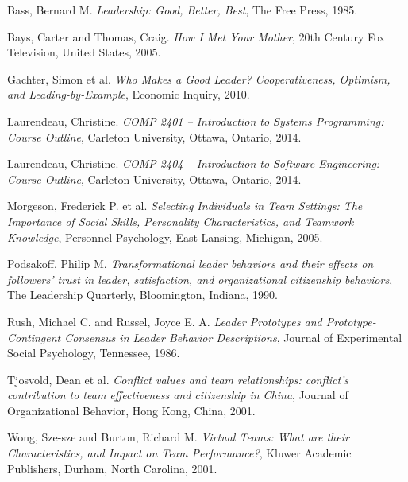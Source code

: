 \documentclass[12pt,letterpaper]{article}
\begin{document}
\begin{thebibliography}{16}
Bass, Bernard M.
{\it Leadership: Good, Better, Best},
The Free Press, 1985.

Bays, Carter and Thomas, Craig.
{\it How I Met Your Mother},
20th Century Fox Television, United States, 2005.

Gachter, Simon et al.
{\it Who Makes a Good Leader? Cooperativeness, Optimism, and Leading-by-Example},
Economic Inquiry, 2010.

Laurendeau, Christine.
{\it COMP 2401 -- Introduction to Systems Programming: Course Outline},
Carleton University, Ottawa, Ontario, 2014.

Laurendeau, Christine.
{\it COMP 2404 -- Introduction to Software Engineering: Course Outline},
Carleton University, Ottawa, Ontario, 2014.

Morgeson, Frederick P. et al.
{\it Selecting Individuals in Team Settings: The Importance of Social Skills, Personality Characteristics, and Teamwork Knowledge},
Personnel Psychology, East Lansing, Michigan, 2005.

Podsakoff, Philip M.
{\it Transformational leader behaviors and their effects on followers' trust in leader, satisfaction, and organizational citizenship behaviors},
The Leadership Quarterly, Bloomington, Indiana, 1990.

Rush, Michael C. and Russel, Joyce E. A.
{\it Leader Prototypes and Prototype-Contingent Consensus in Leader Behavior Descriptions},
Journal of Experimental Social Psychology, Tennessee, 1986.

Tjosvold, Dean et al.
{\it Conflict values and team relationships: conflict's contribution to team effectiveness and citizenship in China},
Journal of Organizational Behavior, Hong Kong, China, 2001.

Wong, Sze-sze and Burton, Richard M.
{\it Virtual Teams: What are their Characteristics, and Impact on Team Performance?},
Kluwer Academic Publishers, Durham, North Carolina, 2001.

\end{thebibliography}
\end{document}

